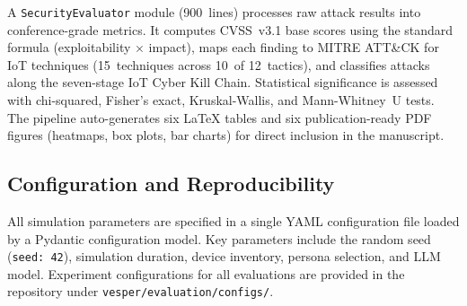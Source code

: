 A \texttt{SecurityEvaluator} module (900~lines) processes raw attack
results into conference-grade metrics.  It computes CVSS~v3.1 base
scores using the standard formula (exploitability $\times$ impact),
maps each finding to MITRE ATT\&CK for IoT techniques (15~techniques
across 10~of 12~tactics), and classifies attacks along the seven-stage
IoT Cyber Kill Chain.  Statistical significance is assessed with
chi-squared, Fisher's exact, Kruskal-Wallis, and Mann-Whitney~U
tests.  The pipeline auto-generates six \LaTeX{} tables and six
publication-ready PDF figures (heatmaps, box plots, bar charts)
for direct inclusion in the manuscript.

\subsection{Configuration and Reproducibility}

All simulation parameters are specified in a single YAML
configuration file loaded by a Pydantic configuration model.
Key parameters include the random seed (\texttt{seed: 42}),
simulation duration, device inventory, persona selection, and LLM
model.  Experiment configurations for all evaluations are provided
in the repository under \texttt{vesper/evaluation/configs/}.
